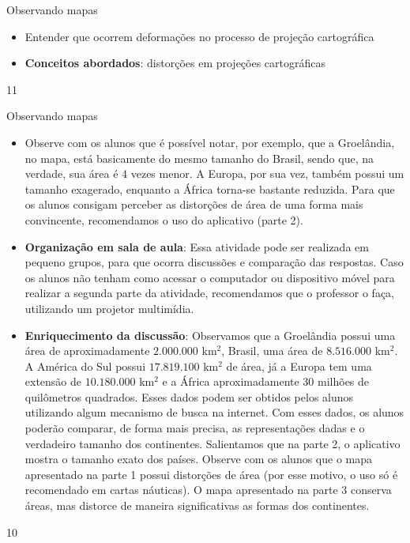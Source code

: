 \begin{ObjetivoEsp}{Observando mapas}
{
  \begin{itemize}
  \item Entender que ocorrem deformações no processo de projeção cartográfica
  \item \textbf{Conceitos abordados}: distorções em projeções cartográficas
  \end{itemize}
}{1}{1}
\end{ObjetivoEsp}
\clearmargin
\begin{Recomenda}{Observando mapas}
{
  \begin{itemize}
  \item Observe com os alunos que é possível notar, por exemplo, que a Groelândia, no mapa, está basicamente do mesmo tamanho do Brasil, sendo que, na verdade, sua área é 4 vezes menor. A Europa, por sua vez, também possui um tamanho exagerado, enquanto a África torna-se bastante reduzida. Para que os alunos consigam perceber as distorções de área de uma forma mais convincente, recomendamos o uso do aplicativo (parte 2).
  \item \textbf{Organização em sala de aula}: Essa atividade pode ser realizada em pequeno grupos, para que ocorra discussões e comparação das respostas. Caso os alunos não tenham como acessar o computador ou dispositivo móvel para realizar a segunda parte da atividade, recomendamos que o professor o faça, utilizando um projetor multimídia.
  \item \textbf{Enriquecimento da discussão}: Observamos que a Groelândia possui uma área de aproximadamente $2.000.000$ km$^{2}$, Brasil, uma área de $8.516.000$ km$^2$. A América do Sul possui $17.819.100$ km$^2$ de área, já a Europa tem uma extensão de $10.180.000$ km$^2$ e a África aproximadamente 30 milhões de quilômetros quadrados. Esses dados podem ser obtidos pelos alunos utilizando algum mecanismo de busca na internet. Com esses dados, os alunos poderão comparar, de forma mais precisa, as representações dadas e o verdadeiro tamanho dos continentes. Salientamos que na parte 2, o aplicativo mostra o tamanho exato dos países. Observe com os alunos que o mapa apresentado na parte 1 possui distorções de área (por esse motivo, o uso só é recomendado em cartas náuticas). O mapa apresentado na parte 3 conserva áreas, mas distorce de maneira significativas as formas dos continentes.
  \end{itemize}
}{1}{0}
\end{Recomenda}
